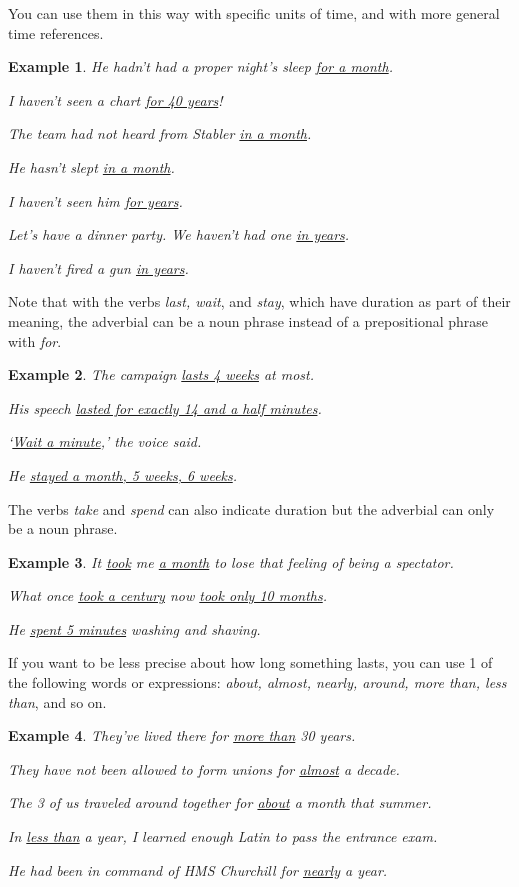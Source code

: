 \documentclass[oneside]{book}
\numberwithin{equation}{section}
\newtheorem{example}{Example}[section]
\begin{document}
You can use them in this way with specific units of time, and with more general time references.
\begin{example}
    He hadn't had a proper night's sleep \underline{for a month}.
    
    I haven't seen a chart \underline{for 40 years}!
    
    The team had not heard from Stabler \underline{in a month}.
    
    He hasn't slept \underline{in a month}.
    
    I haven't seen him \underline{for years}.
    
    Let's have a dinner party. We haven't had one \underline{in years}.
    
    I haven't fired a gun \underline{in years}.
\end{example}
%
\noindent{} Note that with the verbs \textit{last, wait}, and \textit{stay}, which have duration as part of their meaning, the adverbial can be a noun phrase instead of a prepositional phrase with \textit{for}.
\begin{example}
    The campaign \underline{lasts 4 weeks} at most.
    
    His speech \underline{lasted for exactly 14 and a half minutes}.
    
    `\underline{Wait a minute},' the voice said.
    
    He \underline{stayed a month, 5 weeks, 6 weeks}.
\end{example}
The verbs \textit{take} and \textit{spend} can also indicate duration but the adverbial can only be a noun phrase.
\begin{example}
    It \underline{took} me \underline{a month} to lose that feeling of being a spectator.
    
    What once \underline{took a century} now \underline{took only 10 months}.
    
    He \underline{spent 5 minutes} washing and shaving.
\end{example}
%
\noindent{} If you want to be less precise about how long something lasts, you can use 1 of the following words or expressions: \textit{about, almost, nearly, around, more than, less than}, and so on.
\begin{example}
    They've lived there for \underline{more than} 30 years.
    
    They have not been allowed to form unions for \underline{almost} a decade.
    
    The 3 of us traveled around together for \underline{about} a month that summer.
    
    In \underline{less than} a year, I learned enough Latin to pass the entrance exam.
    
    He had been in command of HMS Churchill for \underline{nearly} a year.
\end{example}
\end{document}
